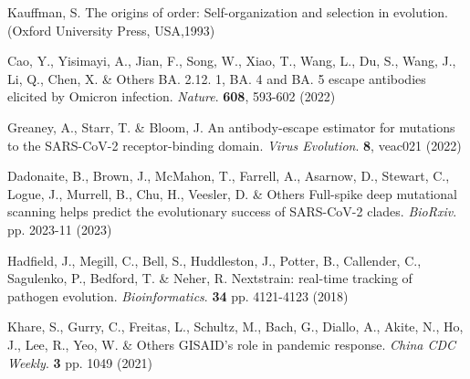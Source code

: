 \documentclass[10pt,letterpaper]{article}
\begin{document}
\begin{thebibliography}{10}
Kauffman, S. The origins of order: Self-organization and selection in evolution. (Oxford University Press, USA,1993)

Cao, Y., Yisimayi, A., Jian, F., Song, W., Xiao, T., Wang, L., Du, S., Wang, J., Li, Q., Chen, X. \& Others BA. 2.12. 1, BA. 4 and BA. 5 escape antibodies elicited by Omicron infection. {\em Nature}. \textbf{608}, 593-602 (2022)

Greaney, A., Starr, T. \& Bloom, J. An antibody-escape estimator for mutations to the SARS-CoV-2 receptor-binding domain. {\em Virus Evolution}. \textbf{8}, veac021 (2022)

Dadonaite, B., Brown, J., McMahon, T., Farrell, A., Asarnow, D., Stewart, C., Logue, J., Murrell, B., Chu, H., Veesler, D. \& Others Full-spike deep mutational scanning helps predict the evolutionary success of SARS-CoV-2 clades. {\em BioRxiv}. pp. 2023-11 (2023)

Hadfield, J., Megill, C., Bell, S., Huddleston, J., Potter, B., Callender, C., Sagulenko, P., Bedford, T. \& Neher, R. Nextstrain: real-time tracking of pathogen evolution. {\em Bioinformatics}. \textbf{34} pp. 4121-4123 (2018)

Khare, S., Gurry, C., Freitas, L., Schultz, M., Bach, G., Diallo, A., Akite, N., Ho, J., Lee, R., Yeo, W. \& Others GISAID's role in pandemic response. {\em China CDC Weekly}. \textbf{3} pp. 1049 (2021)


\end{thebibliography}




\end{document}
